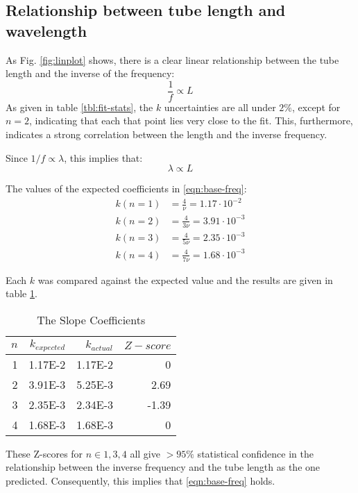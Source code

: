 \documentclass[conference]{IEEEtran}
\begin{document}
\subsection{Relationship between tube length and wavelength}

As Fig. \ref{fig:linplot} shows, there is a clear linear relationship between
the tube length and the inverse of the frequency:
\begin{equation}
    \frac{1}{f} \propto L
\end{equation}
As given in table \ref{tbl:fit-stats}, the $k$ uncertainties are all under $2\%$,
except for $n=2$, indicating that each that point lies very close to the fit.
This, furthermore, indicates a strong correlation between the length and the
inverse frequency.

Since $1/f \propto \lambda$, this implies that:
\begin{equation}
    \lambda \propto L
\end{equation}

The values of the expected coefficients in \eqref{eqn:base-freq}:
\begin{align*}
    k(n=1) &= \frac{4}{\nu} = 1.17 \cdot 10^{-2} \\
    k(n=2) &= \frac{4}{3\nu} = 3.91 \cdot 10^{-3} \\
    k(n=3) &= \frac{4}{5\nu} = 2.35 \cdot 10^{-3} \\
    k(n=4) &= \frac{4}{7\nu} = 1.68 \cdot 10^{-3}
\end{align*}

Each $k$ was compared against the expected value and the results are given in
table \ref{tbl:coeffs}.

\begin{table}[t!]
    \centering
    \caption{The Slope Coefficients}
    \label{tbl:coeffs}
    \begin{tabular}{r | r r r}
        \toprule
        $n$ & $k_{expected}$ & $k_{actual}$ & $Z-score$ \\
        \midrule
        1 & 1.17E-2 & 1.17E-2 & 0 \\
        2 & 3.91E-3 & 5.25E-3 & 2.69 \\
        3 & 2.35E-3 & 2.34E-3 & -1.39 \\
        4 & 1.68E-3 & 1.68E-3 & 0 \\
        \bottomrule
    \end{tabular}
\end{table}

These Z-scores for $n \in {1, 3, 4}$ all give $>95\%$ statistical confidence in
the relationship between the inverse frequency and the tube length as the one
predicted. Consequently, this implies that \eqref{eqn:base-freq} holds.
\end{document}
